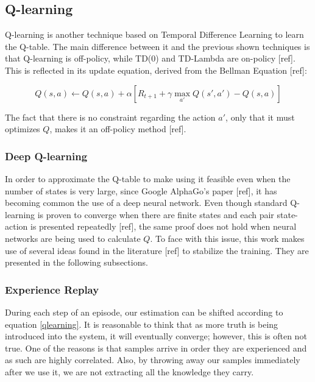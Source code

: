 \documentclass[11pt,twoside]{article}
\begin{document}
\subsection{Q-learning}

Q-learning is another technique based on Temporal Difference Learning to learn the Q-table. The main difference between it and the previous shown techniques is that Q-learning is off-policy, while TD(0) and TD-Lambda are on-policy [ref]. This is reflected in its update equation, derived from the Bellman Equation [ref]:

\begin{equation} \label{qlearning}
	Q(s, a) \leftarrow Q(s, a) + \alpha [R_{t+1} + \gamma \max_{a'} Q(s', a') - Q(s,a)]
\end{equation}

The fact that there is no constraint regarding the action $a'$, only that it must optimizes $Q$, makes it an off-policy method [ref].

\subsubsection{Deep Q-learning}


In order to approximate the Q-table to make using it feasible even when the number of states is very large, since Google AlphaGo's paper [ref], it has becoming common the use of a deep neural network. Even though standard Q-learning is proven to converge when there are finite states and each pair state-action is presented repeatedly [ref], the same proof does not hold when neural networks are being used to calculate $Q$. To face with this issue, this work makes use of several ideas found in the literature [ref] to stabilize the training. They are presented in the following subsections.

\subsubsection{Experience Replay}\label{experience}

During each step of an episode, our estimation can be shifted according to equation \ref{qlearning}. It is reasonable to think that as more truth is being introduced into the system, it will eventually converge; however, this is often not true. One of the reasons is that samples arrive in order they are experienced and as such are highly correlated. Also, by throwing away our samples immediately after we use it, we are not extracting all the knowledge they carry.
\end{document}
